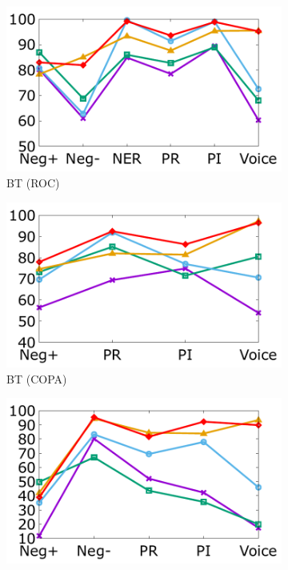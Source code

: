 \begin{figure}[!th]
\centering
\begin{subfigure}[b]{0.24\textwidth}
\centering
\includegraphics[width=\columnwidth]{data/roc_bert.pdf}
\caption{BT (ROC)}
\label{fig:roc_bert}
\end{subfigure}
\hfill
\begin{subfigure}[b]{0.24\textwidth}
\centering
\includegraphics[width=\columnwidth]{data/copa_bert.pdf}
\caption{BT (COPA)}
\label{fig:copa_bert}
\end{subfigure}
\hfill
\begin{subfigure}[b]{0.24\textwidth}
\centering
\includegraphics[width=\columnwidth]{data/arct_bert.pdf}

\end{subfigure}
\end{figure}
